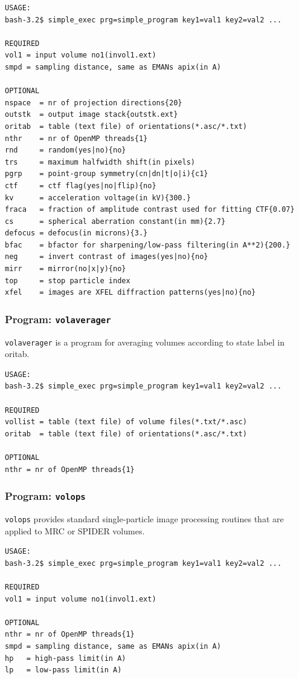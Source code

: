 \documentclass[a4paper,11pt]{article}
\newcommand{\prgname}[1]{\textcolor{NavyBlue}{\texttt{#1}}}
\begin{document}
\begin{verbatim}
USAGE:
bash-3.2$ simple_exec prg=simple_program key1=val1 key2=val2 ...

REQUIRED
vol1 = input volume no1(invol1.ext)
smpd = sampling distance, same as EMANs apix(in A)

OPTIONAL
nspace  = nr of projection directions{20}
outstk  = output image stack{outstk.ext}
oritab  = table (text file) of orientations(*.asc/*.txt)
nthr    = nr of OpenMP threads{1}
rnd     = random(yes|no){no}
trs     = maximum halfwidth shift(in pixels)
pgrp    = point-group symmetry(cn|dn|t|o|i){c1}
ctf     = ctf flag(yes|no|flip){no}
kv      = acceleration voltage(in kV){300.}
fraca   = fraction of amplitude contrast used for fitting CTF{0.07}
cs      = spherical aberration constant(in mm){2.7}
defocus = defocus(in microns){3.}
bfac    = bfactor for sharpening/low-pass filtering(in A**2){200.}
neg     = invert contrast of images(yes|no){no}
mirr    = mirror(no|x|y){no}
top     = stop particle index
xfel    = images are XFEL diffraction patterns(yes|no){no}
\end{verbatim}

\subsubsection{Program: \prgname{volaverager}}
\label{volaverager}
\prgname{volaverager} is a program for averaging volumes according to state label in oritab.

\begin{verbatim}
USAGE:
bash-3.2$ simple_exec prg=simple_program key1=val1 key2=val2 ...

REQUIRED
vollist = table (text file) of volume files(*.txt/*.asc)
oritab  = table (text file) of orientations(*.asc/*.txt)

OPTIONAL
nthr = nr of OpenMP threads{1}
\end{verbatim}

\subsubsection{Program: \prgname{volops}}
\label{volops}
\prgname{volops} provides standard single-particle image processing routines that are applied to MRC or SPIDER volumes.

\begin{verbatim}
USAGE:
bash-3.2$ simple_exec prg=simple_program key1=val1 key2=val2 ...

REQUIRED
vol1 = input volume no1(invol1.ext)

OPTIONAL
nthr = nr of OpenMP threads{1}
smpd = sampling distance, same as EMANs apix(in A)
hp   = high-pass limit(in A)
lp   = low-pass limit(in A)
\end{verbatim}
\end{document}
